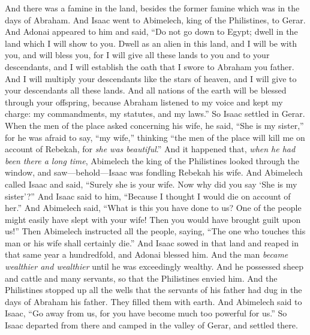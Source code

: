 \begin{biblechapter} %
 And there was a famine in the land, besides the former famine which was in the days of Abraham. And Isaac went to Abimelech, king of the Philistines, to Gerar.
\verse And Adonai appeared to him and said, “Do not go down to Egypt; dwell in the land which I will show to you.
\verse Dwell as an alien in this land, and I will be with you, and will bless you, for I will give all these lands to you and to your descendants, and I will establish the oath that I swore to Abraham you father.
\verse And I will multiply your descendants like the stars of heaven, and I will give to your descendants all these lands. And all nations of the earth will be blessed through your offspring,
\verse because Abraham listened to my voice and kept my charge: my commandments, my statutes, and my laws.”
\verse So Isaac settled in Gerar.
\verse When the men of the place asked concerning his wife, he said, “She is my sister,” for he was afraid to say, “my wife,” thinking “the men of the place will kill me on account of Rebekah, for \textit{she was beautiful}.”
\verse And it happened that, \textit{when he had been there a long time}, Abimelech the king of the Philistines looked through the window, and saw—behold—Isaac was fondling Rebekah his wife.
\verse And Abimelech called Isaac and said, “Surely she is your wife. Now why did you say ‘She is my sister’?” And Isaac said to him, “Because I thought I would die on account of her.”
\verse And Abimelech said, “What is this you have done to us? One of the people might easily have slept with your wife! Then you would have brought guilt upon us!”
\verse Then Abimelech instructed all the people, saying, “The one who touches this man or his wife shall certainly die.”
\verse And Isaac sowed in that land and reaped in that same year a hundredfold, and Adonai blessed him.
\verse And the man \textit{became wealthier and wealthier} until he was exceedingly wealthy.
\verse And he possessed sheep and cattle and many servants, so that the Philistines envied him.
\verse And the Philistines stopped up all the wells that the servants of his father had dug in the days of Abraham his father. They filled them with earth.
\verse And Abimelech said to Isaac, “Go away from us, for you have become much too powerful for us.”
\verse So Isaac departed from there and camped in the valley of Gerar, and settled there.

\end{biblechapter}
